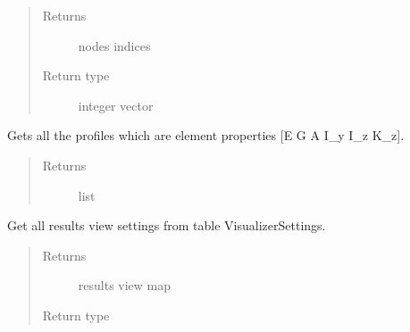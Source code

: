\documentclass[letterpaper,10pt,english]{sphinxmanual}
\begin{document}
\begin{fulllineitems}
\begin{fulllineitems}
\begin{quote}
\begin{description}
\item[{Returns}] \leavevmode
nodes indices

\item[{Return type}] \leavevmode
integer vector

\end{description}\end{quote}

\end{fulllineitems}


\begin{fulllineitems}
\label{\detokenize{api:beamon.database.database.Database.get_profiles}}
Gets all the profiles which are element properties {[}E G A I\_y I\_z K\_z{]}.
\begin{quote}\begin{description}
\item[{Returns}] \leavevmode
list

\end{description}\end{quote}

\end{fulllineitems}


\begin{fulllineitems}
\label{\detokenize{api:beamon.database.database.Database.get_results_view_settings}}
Get all results view settings from table VisualizerSettings.
\begin{quote}\begin{description}
\item[{Returns}] \leavevmode
results view map

\item[{Return type}] \leavevmode
{}

\end{description}\end{quote}

\end{fulllineitems}


\end{fulllineitems}
\end{document}
